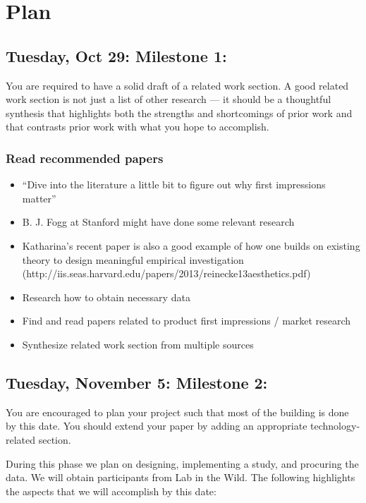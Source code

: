 \documentclass{article}
\begin{document}
\section{Plan}

\subsection{Tuesday, Oct 29: Milestone 1:}

You are required to have a solid draft of a related work section. A good related work section is not just a list of other research --- it should be a thoughtful synthesis that highlights both the strengths and shortcomings of prior work and that contrasts prior work with what you hope to accomplish. \\

\subsubsection{Read recommended papers}
\begin{itemize}
\item “Dive into the literature a little bit to figure out why first impressions matter”
\item B. J. Fogg at Stanford might have done some relevant research
\item Katharina's recent paper is also a good example of how one builds on existing theory to design meaningful empirical investigation (http://iis.seas.harvard.edu/papers/2013/reinecke13aesthetics.pdf)
\item Research how to obtain necessary data
\item Find and read papers related to product first impressions / market research
\item Synthesize related work section from multiple sources
\end{itemize}

\subsection{Tuesday, November 5: Milestone 2:}

You are encouraged to plan your project such that most of the building is done by this date. You should extend your paper by adding an appropriate
technology-related section.

During this phase we plan on designing,  implementing a study, and procuring the data. We will obtain participants from Lab in the Wild. The following highlights the aspects that we will accomplish by this date:
\end{document}

